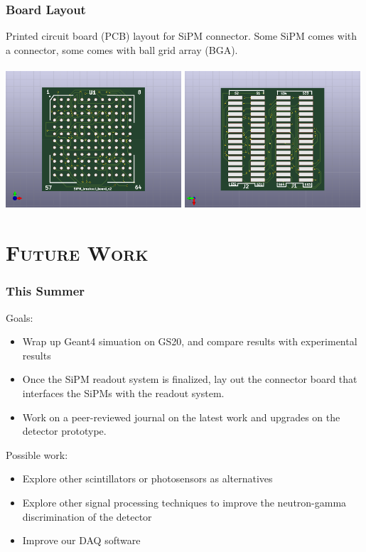 \documentclass[xcolor=x11names, compress, handout]{beamer}
\renewcommand{\(}{\begin{columns}}
\renewcommand{\)}{\end{columns}}
\newcommand{\<}[1]{\begin{column}{#1}}
\renewcommand{\>}{\end{column}}
\begin{document}
\begin{frame}
\frametitle{Board Layout}
 Printed circuit board (PCB) layout for SiPM connector. Some SiPM comes with a connector, some comes with ball grid array (BGA). \\
\ \\
  \includegraphics[width=0.49\textwidth]{images/pcb_sipm_front.png}
  \includegraphics[width=0.49\textwidth]{images/pcb_sipm_back.png}
\end{frame}


\section{\scshape Future Work}

\begin{frame}[c]
\frametitle{This Summer}
Goals:
  \begin{itemize}
    \item Wrap up Geant4 simuation on GS20, and compare results with experimental results
    \item Once the SiPM readout system is finalized, lay out the connector board that interfaces the SiPMs with the readout system.
    \item Work on a peer-reviewed journal on the latest work and upgrades on the detector prototype.
  \end{itemize}

Possible work:
  \begin{itemize}
    \item Explore other scintillators or photosensors as alternatives
    \item Explore other signal processing techniques to improve the neutron-gamma discrimination of the detector
    \item Improve our DAQ software 
  \end{itemize}
\end{frame}
\end{document}
